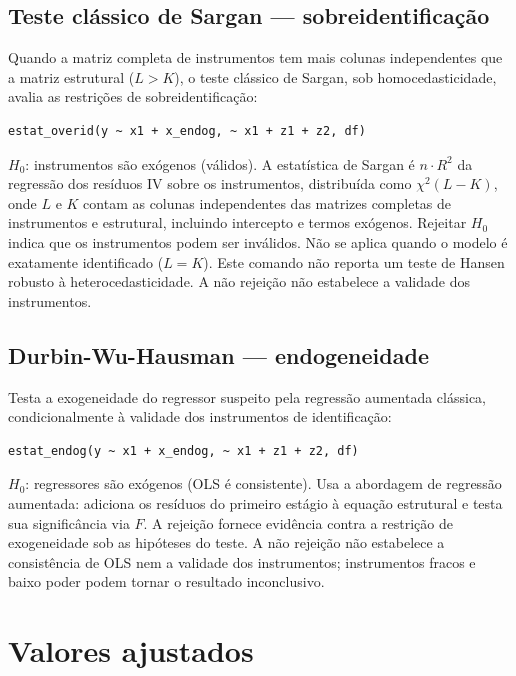 \subsection{Teste clássico de Sargan --- sobreidentificação}

Quando a matriz completa de instrumentos tem mais colunas independentes
que a matriz estrutural ($L > K$), o teste clássico de Sargan, sob
homocedasticidade, avalia as restrições de sobreidentificação:

\begin{lstlisting}
estat_overid(y ~ x1 + x_endog, ~ x1 + z1 + z2, df)
\end{lstlisting}

$H_0$: instrumentos são exógenos (válidos). A estatística de Sargan é
$n \cdot R^2$ da regressão dos resíduos IV sobre os instrumentos,
distribuída como $\chi^2(L - K)$, onde $L$ e $K$ contam as colunas
independentes das matrizes completas de instrumentos e estrutural, incluindo
intercepto e termos exógenos. Rejeitar $H_0$ indica que os instrumentos podem
ser inválidos. Não se aplica quando o modelo é exatamente identificado
($L = K$). Este comando não reporta um teste de Hansen robusto à
heterocedasticidade. A não rejeição não estabelece a validade dos instrumentos.

\subsection{Durbin-Wu-Hausman — endogeneidade}

Testa a exogeneidade do regressor suspeito pela regressão aumentada clássica,
condicionalmente à validade dos instrumentos de identificação:

\begin{lstlisting}
estat_endog(y ~ x1 + x_endog, ~ x1 + z1 + z2, df)
\end{lstlisting}

$H_0$: regressores são exógenos (OLS é consistente). Usa a abordagem de
regressão aumentada: adiciona os resíduos do primeiro estágio à equação
estrutural e testa sua significância via $F$. A rejeição fornece evidência
contra a restrição de exogeneidade sob as hipóteses do teste. A não rejeição
não estabelece a consistência de OLS nem a validade dos instrumentos;
instrumentos fracos e baixo poder podem tornar o resultado inconclusivo.

\section{Valores ajustados}

